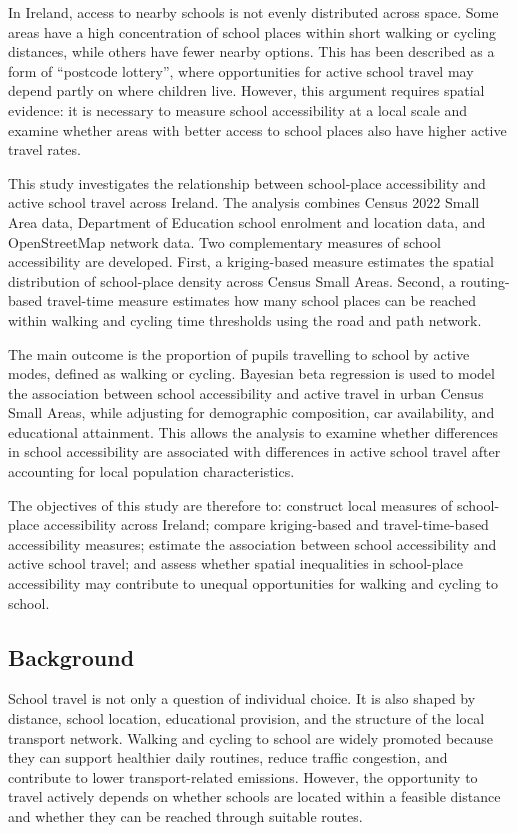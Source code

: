 \documentclass{article}
\begin{document}
In Ireland, access to nearby schools is not evenly distributed across
space. Some areas have a high concentration of school places within
short walking or cycling distances, while others have fewer nearby
options. This has been described as a form of ``postcode lottery'',
where opportunities for active school travel may depend partly on where
children live. However, this argument requires spatial evidence: it is
necessary to measure school accessibility at a local scale and examine
whether areas with better access to school places also have higher
active travel rates.

This study investigates the relationship between school-place
accessibility and active school travel across Ireland. The analysis
combines Census 2022 Small Area data, Department of Education school
enrolment and location data, and OpenStreetMap network data. Two
complementary measures of school accessibility are developed. First, a
kriging-based measure estimates the spatial distribution of school-place
density across Census Small Areas. Second, a routing-based travel-time
measure estimates how many school places can be reached within walking
and cycling time thresholds using the road and path network.

The main outcome is the proportion of pupils travelling to school by
active modes, defined as walking or cycling. Bayesian beta regression is
used to model the association between school accessibility and active
travel in urban Census Small Areas, while adjusting for demographic
composition, car availability, and educational attainment. This allows
the analysis to examine whether differences in school accessibility are
associated with differences in active school travel after accounting for
local population characteristics.

The objectives of this study are therefore to: construct local measures
of school-place accessibility across Ireland; compare kriging-based and
travel-time-based accessibility measures; estimate the association
between school accessibility and active school travel; and assess
whether spatial inequalities in school-place accessibility may
contribute to unequal opportunities for walking and cycling to school.

\subsection{Background}\label{background}

School travel is not only a question of individual choice. It is also
shaped by distance, school location, educational provision, and the
structure of the local transport network. Walking and cycling to school
are widely promoted because they can support healthier daily routines,
reduce traffic congestion, and contribute to lower transport-related
emissions. However, the opportunity to travel actively depends on
whether schools are located within a feasible distance and whether they
can be reached through suitable routes.
\end{document}
